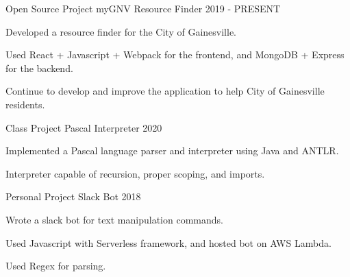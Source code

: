 

\begin{cventries}

\cventry
    {Open Source Project} %
    {myGNV Resource Finder} %
    {} %
    {2019 - PRESENT} %
    {
    \begin{cvitems} %
        \item {Developed a resource finder for the City of Gainesville.}
        \item {Used React + Javascript + Webpack for the frontend, and MongoDB + Express for the backend.}
        \item {Continue to develop and improve the application to help City of Gainesville residents.}
    \end{cvitems}
    }


\cventry
{Class Project} %
{Pascal Interpreter} %
{} %
{2020} %
{
  \begin{cvitems} %
    \item {Implemented a Pascal language parser and interpreter using Java and ANTLR.}
    \item {Interpreter capable of recursion, proper scoping, and imports.}
  \end{cvitems}
}


  \cventry
    {Personal Project} %
    {Slack Bot} %
    {} %
    {2018} %
    {
      \begin{cvitems} %
        \item {Wrote a slack bot for text manipulation commands.}
        \item {Used Javascript with Serverless framework, and hosted bot on AWS Lambda.}
        \item {Used Regex for parsing.}
      \end{cvitems}
    }

\end{cventries}
